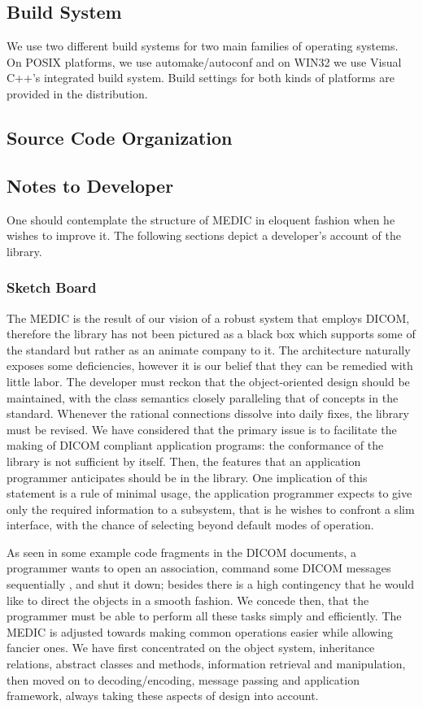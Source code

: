 \documentclass[a4paper,10pt]{article}
\begin{document}
\subsection{Build System}

We use two different build systems for two main families of operating
systems. On POSIX platforms, we use automake/autoconf and on WIN32 we
use Visual C++'s integrated build system. Build settings for both
kinds of platforms are provided in the distribution.

\subsection{Source Code Organization}

\subsection{Notes to Developer}

One should contemplate the structure of MEDIC in eloquent fashion when he
wishes to improve it. The following sections depict a developer's account
of the library.

\subsubsection{Sketch Board}

The MEDIC is the result of our vision of a robust system that employs DICOM,
therefore the library has not been pictured as a black box which supports
some of the standard but rather as an animate company to it. The
architecture naturally exposes some deficiencies, however it is our belief
that they can be remedied with little labor. The developer must reckon that
the object-oriented design should be maintained, with the class semantics
closely paralleling that of concepts in the standard. Whenever the rational
connections dissolve into daily fixes, the library must be revised. We have
considered that the primary issue is to facilitate the making of DICOM
compliant application programs: the conformance of the library is not
sufficient by itself. Then, the features that an application programmer
anticipates should be in the library. One implication of this statement is a
rule of minimal usage, the application programmer expects to give only the
required information to a subsystem, that is he wishes to confront a slim
interface, with the chance of selecting beyond default modes of operation.

As seen in some example code fragments in the DICOM documents, a programmer
wants to open an association, command some DICOM messages sequentially , and
shut it down; besides there is a high contingency that he would like to
direct the objects in a smooth fashion. We concede then, that the programmer
must be able to perform all these tasks simply and efficiently. The MEDIC is
adjusted towards making common operations easier while allowing fancier
ones. We have first concentrated on the object system, inheritance
relations, abstract classes and methods, information retrieval and
manipulation, then moved on to decoding/encoding, message passing and
application framework, always taking these aspects of design into account.
\end{document}
